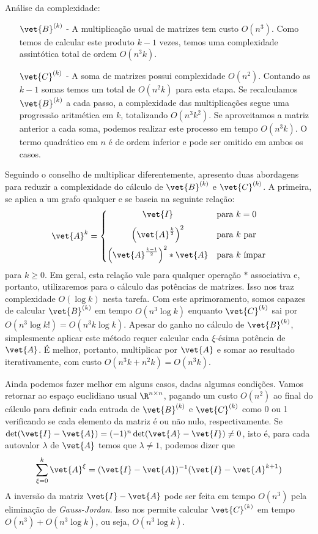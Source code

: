 \documentclass[l15, tikzdraw]{homework}
\begin{document}
	\subsubquest%
	Análise da complexidade:
	\begin{itemize}
		\item [$\vet{B}^{(k)}$ -] A multiplicação usual de matrizes tem custo $O(n^3)$. Como temos de calcular este produto $k - 1$ vezes, temos uma complexidade assintótica total de ordem $O(n^3 k)$.
		
		\item [$\vet{C}^{(k)}$ -] A soma de matrizes possui complexidade $O(n^2)$. Contando as $k - 1$ somas temos um total de $O(n^2 k)$ para esta etapa. Se recalculamos $\vet{B}^{(k)}$ a cada passo, a complexidade das multiplicações segue uma progressão aritmética em $k$, totalizando $O(n^3 k^2)$. Se aproveitamos a matriz anterior a cada soma, podemos realizar este processo em tempo  $O(n^3 k)$. O termo quadrático em $n$ é de ordem inferior e pode ser omitido em ambos os casos.
	\end{itemize}
	
	\subsubquest%
	Seguindo o conselho de multiplicar diferentemente, apresento duas abordagens para reduzir a complexidade do cálculo de $\vet{B}^{(k)}$ e $\vet{C}^{(k)}$. A primeira, se aplica a um grafo qualquer e se baseia na seguinte relação:
		$$\vet{A}^k = \left\{\begin{array}{@{}cl@{}}
			\vet{I} &\text{para } k = 0\\[1.5ex]
			\left(\vet{A}^{\frac{k}{2}}\right)^2 &\text{para } k \text{ par}\\[1.5ex]
			\left(\vet{A}^{\frac{k - 1}{2}}\right)^2 \ast \vet{A} &\text{para } k \text{ ímpar}
		\end{array}\right.$$
	para $k \ge 0$. Em geral, esta relação vale para qualquer operação $\ast$ associativa e, portanto, utilizaremos para o cálculo das potências de matrizes. Isso nos traz complexidade $O(\log k)$ nesta tarefa. Com este aprimoramento, somos capazes de calcular $\vet{B}^{(k)}$ em tempo $O(n^3 \log k)$ enquanto $\vet{C}^{(k)}$ sai por $O(n^3 \log k!) = O(n^3 k \log k)$. Apesar do ganho no cálculo de $\vet{B}^{(k)}$, simplesmente aplicar este método requer calcular cada $\xi$-ésima potência de $\vet{A}$. É melhor, portanto, multiplicar por $\vet{A}$ e somar ao resultado iterativamente, com custo $O(n^3 k + n^2 k) = O(n^3 k)$.\par

	Ainda podemos fazer melhor em alguns casos, dadas algumas condições. Vamos retornar ao espaço euclidiano usual $\R^{n \times n}$, pagando um custo $O(n^2)$ ao final do cálculo para definir cada entrada de $\vet{B}^{(k)}$ e $\vet{C}^{(k)}$ como 0 ou 1 verificando se cada elemento da matriz é ou não nulo, respectivamente. Se $\det (\vet{I} - \vet{A}) = (-1)^n \det (\vet{A} - \vet{I}) \neq 0$, isto é, para cada autovalor $\lambda$ de $\vet{A}$ temos que $\lambda \neq 1$, podemos dizer que
		$$\sum_{\xi = 0}^{k} \vet{A}^\xi = (\vet{I} - \vet{A})^{-1} (\vet{I} - \vet{A}^{k + 1})$$
	A inversão da matriz $\vet{I} - \vet{A}$ pode ser feita em tempo $O(n^3)$ pela eliminação de \textit{Gauss-Jordan}. Isso nos permite calcular $\vet{C}^{(k)}$ em tempo $O(n^3) + O(n^3 \log k)$, ou seja, $O(n^3 \log k)$.\par
\end{document}
